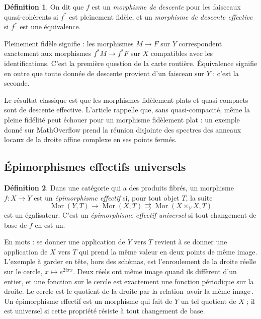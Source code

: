 \documentclass[11pt,a4paper]{amsart}
\theoremstyle{definition}
\newtheorem{definition}{Définition}
\theoremstyle{plain}
\theoremstyle{remark}
\newcommand{\Mor}{\operatorname{Mor}}
\begin{document}
\begin{definition}
On dit que $f$ est un \emph{morphisme de descente} pour les faisceaux quasi-cohérents si $f^*$ est pleinement fidèle, et un \emph{morphisme de descente effective} si $f^*$ est une équivalence.
\end{definition}

Pleinement fidèle signifie : les morphismes $M\to F$ sur $Y$ correspondent exactement aux morphismes $f^*M\to f^*F$ sur $X$ compatibles avec les identifications. C'est la première question de la carte routière. Équivalence signifie en outre que toute donnée de descente provient d'un faisceau sur $Y$ : c'est la seconde.

Le résultat classique est que les morphismes fidèlement plats et quasi-compacts sont de descente effective. L'article rappelle que, sans quasi-compacité, même la pleine fidélité peut échouer pour un morphisme fidèlement plat : un exemple donné sur MathOverflow prend la réunion disjointe des spectres des anneaux locaux de la droite affine complexe en ses points fermés.

\subsection{Épimorphismes effectifs universels}

\begin{definition}
Dans une catégorie qui a des produits fibrés, un morphisme $f\colon X\to Y$ est un \emph{épimorphisme effectif} si, pour tout objet $T$, la suite
\[
\Mor(Y,T)\to\Mor(X,T)\rightrightarrows\Mor(X\times_YX,T)
\]
est un égalisateur. C'est un \emph{épimorphisme effectif universel} si tout changement de base de $f$ en est un.
\end{definition}

En mots : se donner une application de $Y$ vers $T$ revient à se donner une application de $X$ vers $T$ qui prend la même valeur en deux points de même image. L'exemple à garder en tête, hors des schémas, est l'enroulement de la droite réelle sur le cercle, $x\mapsto e^{2i\pi x}$. Deux réels ont même image quand ils diffèrent d'un entier, et une fonction sur le cercle est exactement une fonction périodique sur la droite. Le cercle est le quotient de la droite par la relation \guillemotleft\,avoir la même image\,\guillemotright{}. Un épimorphisme effectif est un morphisme qui fait de $Y$ un tel quotient de $X$ ; il est universel si cette propriété résiste à tout changement de base.
\end{document}
